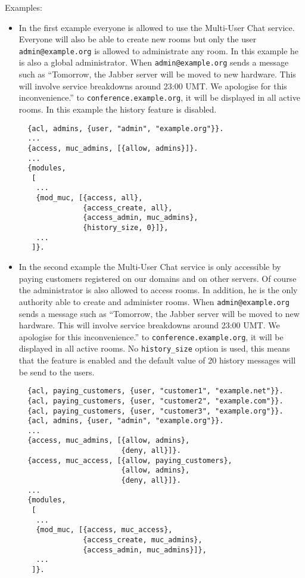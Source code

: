\documentclass[a4paper,10pt]{article}
\newcommand{\jid}[1]{\texttt{#1}}
\newcommand{\term}[1]{\texttt{#1}}
\newcommand{\Jabber}{Jabber}
\begin{document}
Examples:
\begin{itemize}
\item In the first example everyone is allowed to use the Multi-User Chat
  service. Everyone will also be able to create new rooms but only the user
  \jid{admin@example.org} is allowed to administrate any room. In this
  example he is also a global administrator. When \jid{admin@example.org}
  sends a message such as ``Tomorrow, the \Jabber{} server will be moved
  to new hardware. This will involve service breakdowns around 23:00 UMT.
  We apologise for this inconvenience.'' to \jid{conference.example.org},
  it will be displayed in all active rooms. In this example the history
  feature is disabled.
  \begin{verbatim}
  {acl, admins, {user, "admin", "example.org"}}.
  ...
  {access, muc_admins, [{allow, admins}]}.
  ...
  {modules,
   [
    ...
    {mod_muc, [{access, all},
               {access_create, all},
               {access_admin, muc_admins},
               {history_size, 0}]},
    ...
   ]}.
\end{verbatim}
\item In the second example the Multi-User Chat service is only accessible by
  paying customers registered on our domains and on other servers. Of course
  the administrator is also allowed to access rooms. In addition, he is the
  only authority able to create and administer rooms. When
  \jid{admin@example.org} sends a message such as ``Tomorrow, the \Jabber{}
  server will be moved to new hardware. This will involve service breakdowns
  around 23:00 UMT. We apologise for this inconvenience.'' to
  \jid{conference.example.org}, it will be displayed in all active rooms. No
  \term{history\_size} option is used, this means that the feature is enabled
  and the default value of 20 history messages will be send to the users.
  \begin{verbatim}
  {acl, paying_customers, {user, "customer1", "example.net"}}.
  {acl, paying_customers, {user, "customer2", "example.com"}}.
  {acl, paying_customers, {user, "customer3", "example.org"}}.
  {acl, admins, {user, "admin", "example.org"}}.
  ...
  {access, muc_admins, [{allow, admins},
                        {deny, all}]}.
  {access, muc_access, [{allow, paying_customers},
                        {allow, admins},
                        {deny, all}]}.
  ...
  {modules,
   [
    ...
    {mod_muc, [{access, muc_access},
               {access_create, muc_admins},
               {access_admin, muc_admins}]},
    ...
   ]}.
\end{verbatim}
\end{itemize}
\end{document}
